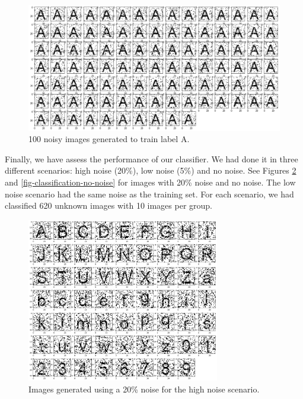 \begin{figure}[!htb]
\centering\includegraphics[width=\textwidth]{./images02/classification/trainingA.png}
\caption{100 noisy images generated to train label A.
\label{fig-classification-training-A}}
\end{figure}

Finally, we have assess the performance of our classifier. We had done it in three different scenarios: high noise (20\%), low noise (5\%) and no noise. See Figures \ref{fig-classification-noise-high} and \ref{fig-classification-no-noise} for images with 20\% noise and no noise. The low noise scenario had the same noise as the training set. For each scenario, we had classified 620 unknown images with 10 images per group.

\begin{figure}[!htb]
\centering\includegraphics[width=0.75\textwidth]{./images02/classification/noise-high.png}
\caption{Images generated using a 20\% noise for the high noise scenario.
\label{fig-classification-noise-high}}
\end{figure}

